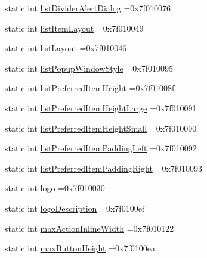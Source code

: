 \begin{DoxyCompactItemize}
static int \hyperlink{classandroid_1_1support_1_1v7_1_1mediarouter_1_1R_1_1attr_a99270b2c4e90683ae9ac0c8d7ff8d52e}{list\+Divider\+Alert\+Dialog} =0x7f010076
\item 
static int \hyperlink{classandroid_1_1support_1_1v7_1_1mediarouter_1_1R_1_1attr_af5109bbc00fa0963f8746508b2e0d24b}{list\+Item\+Layout} =0x7f010049
\item 
static int \hyperlink{classandroid_1_1support_1_1v7_1_1mediarouter_1_1R_1_1attr_a3e1b4d3a484b300077cba762ae959e8e}{list\+Layout} =0x7f010046
\item 
static int \hyperlink{classandroid_1_1support_1_1v7_1_1mediarouter_1_1R_1_1attr_a8fe9c7c02eb28bd85a85c0e42f4624c4}{list\+Popup\+Window\+Style} =0x7f010095
\item 
static int \hyperlink{classandroid_1_1support_1_1v7_1_1mediarouter_1_1R_1_1attr_aa9a404fba2eca8bca49c55849a05e777}{list\+Preferred\+Item\+Height} =0x7f01008f
\item 
static int \hyperlink{classandroid_1_1support_1_1v7_1_1mediarouter_1_1R_1_1attr_a339cb47f5138891279e93ced966d6637}{list\+Preferred\+Item\+Height\+Large} =0x7f010091
\item 
static int \hyperlink{classandroid_1_1support_1_1v7_1_1mediarouter_1_1R_1_1attr_af8335a46023911148d7e44055b5afc03}{list\+Preferred\+Item\+Height\+Small} =0x7f010090
\item 
static int \hyperlink{classandroid_1_1support_1_1v7_1_1mediarouter_1_1R_1_1attr_a27c5b6c05830bc20ec3b8aede4cb84b5}{list\+Preferred\+Item\+Padding\+Left} =0x7f010092
\item 
static int \hyperlink{classandroid_1_1support_1_1v7_1_1mediarouter_1_1R_1_1attr_ab8b4729519d0a70934dac6d8504e64cf}{list\+Preferred\+Item\+Padding\+Right} =0x7f010093
\item 
static int \hyperlink{classandroid_1_1support_1_1v7_1_1mediarouter_1_1R_1_1attr_a822b5539967874c6df4234b52a556c30}{logo} =0x7f010030
\item 
static int \hyperlink{classandroid_1_1support_1_1v7_1_1mediarouter_1_1R_1_1attr_abbff551ca1e784343cf6ac9acf175951}{logo\+Description} =0x7f0100ef
\item 
static int \hyperlink{classandroid_1_1support_1_1v7_1_1mediarouter_1_1R_1_1attr_aa93a1e8f467b0b783c9a9b2ec3ad6159}{max\+Action\+Inline\+Width} =0x7f010122
\item 
static int \hyperlink{classandroid_1_1support_1_1v7_1_1mediarouter_1_1R_1_1attr_afa356a4dee8535ed3f96158d489bb1c3}{max\+Button\+Height} =0x7f0100ea
\item 

\end{DoxyCompactItemize}

